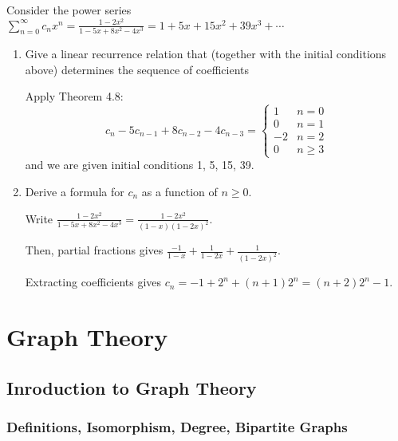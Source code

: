 \documentclass[class=math239,notes,tikz]{agony}
\begin{document}
\begin{xca}
  Consider the power series $\sum_{n=0}^\infty c_n x^n
    = \frac{1-2x^2}{1-5x+8x^2-4x^3}
    = 1 + 5x + 15x^2 + 39x^3 + \dotsb$
\end{xca}
\begin{enumerate}
  \item Give a linear recurrence relation that
        (together with the initial conditions above)
        determines the sequence of coefficients
        \begin{sol}
          Apply Theorem 4.8:
          \[
            c_n - 5c_{n-1} + 8c_{n-2} - 4c_{n-3} = \begin{cases}
              1  & n = 0    \\
              0  & n = 1    \\
              -2 & n = 2    \\
              0  & n \geq 3
            \end{cases}
          \]
          and we are given initial conditions 1, 5, 15, 39.
        \end{sol}
  \item Derive a formula for $c_n$ as a function of $n \geq 0$.
        \begin{sol}
          Write $\frac{1-2x^2}{1-5x+8x^2-4x^3} = \frac{1-2x^2}{(1-x)(1-2x)^2}$.

          Then, partial fractions gives $\frac{-1}{1-x} + \frac{1}{1-2x} + \frac{1}{(1-2x)^2}$.

          Extracting coefficients gives $c_n = -1 + 2^n + (n+1)2^n = (n+2)2^n - 1$.
        \end{sol}
\end{enumerate}

\chapter{Graph Theory}

\setcounter{section}{3}
\section{Inroduction to Graph Theory}

\setcounter{subsection}{3}
\subsection{Definitions, Isomorphism, Degree, Bipartite Graphs}
\end{document}

